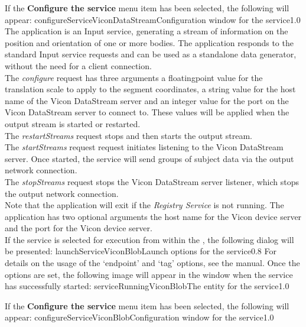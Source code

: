 If the \textbf{Configure the service} menu item has been selected, the following will
appear:
%
{configureServiceViconDataStream}{Configuration window for the \emph{\VDSI} service}{1.0}
\secondaryEnd
\primaryEnd
{}
The  application is an Input service,
generating a stream of information on the position and orientation of one or more bodies.
The application responds to the standard Input service requests and can be used as a
standalone data generator, without the need for a client connection.\\

The \emph{configure} request has three arguments \longDash{} a floating\longDash{}point
value for the translation scale to apply to the segment coordinates, a string value for
the host name of the Vicon DataStream server and an integer value for the port on the
Vicon DataStream server to connect to.
These values will be applied when the output stream is started or restarted.\\ 

The \emph{restartStreams} request stops and then starts the output stream.\\

The \emph{startStreams} request request initiates listening to the Vicon DataStream
server.
Once started, the service will send groups of subject data via the output \yarp{} network
connection.\\

The \emph{stopStreams} request stops the Vicon DataStream server listener, which stops the
output \yarp{} network connection.\\ 

Note that the application will exit if the \emph{Registry Service} is not running.
The application has two optional arguments \longDash{} the host name for the Vicon device
server and the port for the Vicon device server.
\insertAppParameters
\insertTagDescription{\VDSI}
\insertInputServiceComment\\

\insertStandardServiceCommands
\secondaryEnd
{}
If the service is selected for execution from within the \emph{\MMMU}, the following
dialog will be presented:
%
{launchServiceViconBlob}{Launch options for the \VBI{} service}{0.8}
\condPage{}
For details on the usage of the `endpoint' and `tag' options, see the \emph{\MMMU} manual.
Once the options are set, the following image will appear in the \emph{\MMMU} window when
the service has successfully started:
%
{serviceRunningViconBlob}{The \emph{\MMMU} entity for the \VBI{} service}{1.0}

If the \textbf{Configure the service} menu item has been selected, the following will
appear:
%
{configureServiceViconBlob}{Configuration window for the \emph{\VBI} service}{1.0}
\secondaryEnd
\primaryEnd{}
